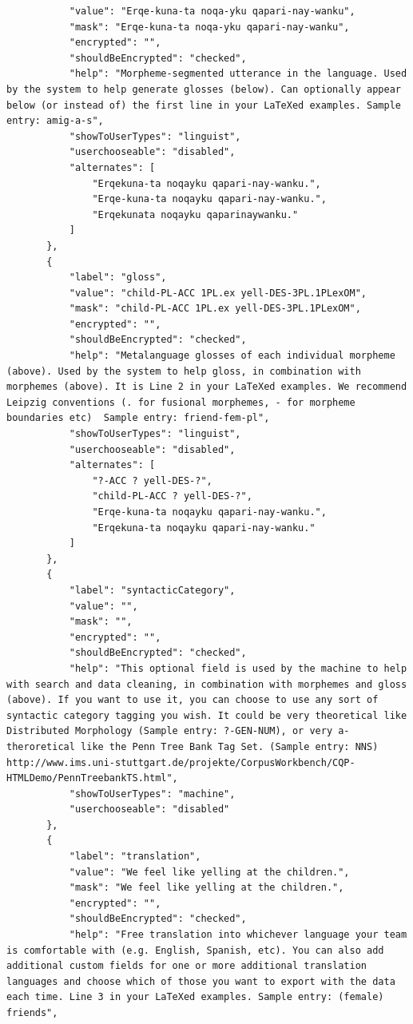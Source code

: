 \documentclass[12pt]{article}
\begin{document}
\begin{verbatim}
           "value": "Erqe-kuna-ta noqa-yku qapari-nay-wanku",
           "mask": "Erqe-kuna-ta noqa-yku qapari-nay-wanku",
           "encrypted": "",
           "shouldBeEncrypted": "checked",
           "help": "Morpheme-segmented utterance in the language. Used by the system to help generate glosses (below). Can optionally appear below (or instead of) the first line in your LaTeXed examples. Sample entry: amig-a-s",
           "showToUserTypes": "linguist",
           "userchooseable": "disabled",
           "alternates": [
               "Erqekuna-ta noqayku qapari-nay-wanku.",
               "Erqe-kuna-ta noqayku qapari-nay-wanku.",
               "Erqekunata noqayku qaparinaywanku."
           ]
       },
       {
           "label": "gloss",
           "value": "child-PL-ACC 1PL.ex yell-DES-3PL.1PLexOM",
           "mask": "child-PL-ACC 1PL.ex yell-DES-3PL.1PLexOM",
           "encrypted": "",
           "shouldBeEncrypted": "checked",
           "help": "Metalanguage glosses of each individual morpheme (above). Used by the system to help gloss, in combination with morphemes (above). It is Line 2 in your LaTeXed examples. We recommend Leipzig conventions (. for fusional morphemes, - for morpheme boundaries etc)  Sample entry: friend-fem-pl",
           "showToUserTypes": "linguist",
           "userchooseable": "disabled",
           "alternates": [
               "?-ACC ? yell-DES-?",
               "child-PL-ACC ? yell-DES-?",
               "Erqe-kuna-ta noqayku qapari-nay-wanku.",
               "Erqekuna-ta noqayku qapari-nay-wanku."
           ]
       },
       {
           "label": "syntacticCategory",
           "value": "",
           "mask": "",
           "encrypted": "",
           "shouldBeEncrypted": "checked",
           "help": "This optional field is used by the machine to help with search and data cleaning, in combination with morphemes and gloss (above). If you want to use it, you can choose to use any sort of syntactic category tagging you wish. It could be very theoretical like Distributed Morphology (Sample entry: ?-GEN-NUM), or very a-theroretical like the Penn Tree Bank Tag Set. (Sample entry: NNS) http://www.ims.uni-stuttgart.de/projekte/CorpusWorkbench/CQP-HTMLDemo/PennTreebankTS.html",
           "showToUserTypes": "machine",
           "userchooseable": "disabled"
       },
       {
           "label": "translation",
           "value": "We feel like yelling at the children.",
           "mask": "We feel like yelling at the children.",
           "encrypted": "",
           "shouldBeEncrypted": "checked",
           "help": "Free translation into whichever language your team is comfortable with (e.g. English, Spanish, etc). You can also add additional custom fields for one or more additional translation languages and choose which of those you want to export with the data each time. Line 3 in your LaTeXed examples. Sample entry: (female) friends",

\end{verbatim}
\end{document}
